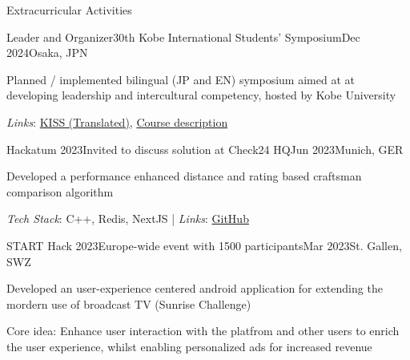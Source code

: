 \documentclass{kyvernitis-resume}
\begin{document}
\begin{section}{Extracurricular Activities}
        \pagebreak

         \begin{subsection}{Leader and Organizer}{30th Kobe International Students' Symposium}{Dec 2024}{Osaka, JPN}
         \item{Planned / implemented bilingual (JP and EN) symposium aimed at at developing leadership and intercultural competency, hosted by Kobe University}
        \end{subsection}
        \textit{Links}: \href{https://www-kobe--u-ac-jp.translate.goog/ja/announcement/20250106-66392/?_x_tr_sl=auto&_x_tr_tl=en&_x_tr_hl=en&_x_tr_pto=wapp}{KISS (Translated)}, \href{https://kym22-web.ofc.kobe-u.ac.jp/kobe_e_syllabus/2024/20/data/2024_3U084.html}{Course description}
    



     \begin{subsection}{Hackatum 2023}{Invited to discuss solution at Check24 HQ}{Jun 2023}{Munich, GER}
        \item{Developed a performance enhanced distance and rating based craftsman comparison algorithm}

        \end{subsection}
        \textit{Tech Stack}: C++, Redis, NextJS\hspace{0.1cm} | \hspace{0.1cm}
        \textit{Links}: \href{https://github.com/zhngharry/HackaTUM-2023-Submission}{GitHub}
        

    \begin{subsection}{START Hack 2023}{Europe-wide event with 1500 participants}{Mar 2023}{St. Gallen, SWZ}
        \item{Developed an user-experience centered android application for extending the mordern use of broadcast TV (Sunrise Challenge)}
        \item{Core idea: Enhance user interaction with the platfrom and other users to enrich the user experience, whilst enabling personalized ads for increased revenue}


\end{subsection}
\end{section}
\end{document}
